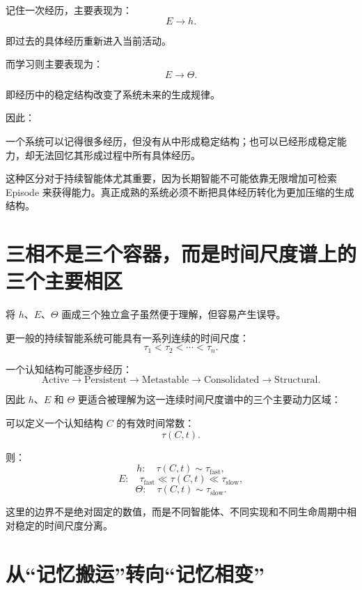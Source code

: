 记住一次经历，主要表现为：
\[
\boxed{
E\rightarrow h.
}
\]

即过去的具体经历重新进入当前活动。

而学习则主要表现为：
\[
\boxed{
E\rightarrow\Theta.
}
\]

即经历中的稳定结构改变了系统未来的生成规律。

因此：
\begin{statementbox}
\centering
{}
\end{statementbox}

一个系统可以记得很多经历，但没有从中形成稳定结构；也可以已经形成稳定能力，却无法回忆其形成过程中所有具体经历。

这种区分对于持续智能体尤其重要，因为长期智能不可能依靠无限增加可检索 Episode 来获得能力。真正成熟的系统必须不断把具体经历转化为更加压缩的生成结构。

\section{三相不是三个容器，而是时间尺度谱上的三个主要相区}

将 $h$、$E$、$\Theta$ 画成三个独立盒子虽然便于理解，但容易产生误导。

更一般的持续智能系统可能具有一系列连续的时间尺度：
\[
\tau_1<\tau_2<\cdots<\tau_n.
\]

一个认知结构可能逐步经历：
\[
\text{Active}
\rightarrow
\text{Persistent}
\rightarrow
\text{Metastable}
\rightarrow
\text{Consolidated}
\rightarrow
\text{Structural}.
\]

因此 $h$、$E$ 和 $\Theta$ 更适合被理解为这一连续时间尺度谱中的三个主要动力区域：
\begin{statementbox}
\centering
{}
\end{statementbox}

可以定义一个认知结构 $C$ 的有效时间常数：
\[
\tau(C,t).
\]

则：
\[
h:
\quad
\tau(C,t)\sim\tau_{\mathrm{fast}},
\]
\[
E:
\quad
\tau_{\mathrm{fast}}
\ll
\tau(C,t)
\ll
\tau_{\mathrm{slow}},
\]
\[
\Theta:
\quad
\tau(C,t)\sim\tau_{\mathrm{slow}}.
\]

这里的边界不是绝对固定的数值，而是不同智能体、不同实现和不同生命周期中相对稳定的时间尺度分离。

\section{从“记忆搬运”转向“记忆相变”}


